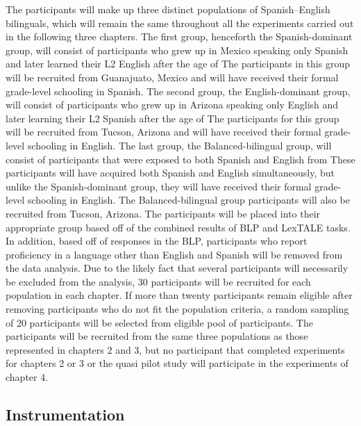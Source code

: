 \documentclass[
12pt, %
english, %
doublespacing, %
nolistspacing, %
liststotoc, %
headsepline, %
chapterinoneline, %
openany, %
]{DoctoralThesis}\usepackage[]{graphicx}\usepackage[]{color}
\begin{document}
The participants will make up three distinct populations of Spanish–English bilinguals, which will remain the same throughout all the experiments carried out in the following three chapters. The first group, henceforth the Spanish-dominant group, will consist of participants who grew up in Mexico speaking only Spanish and later learned their L2 English after the age of %
The participants in this group will be recruited from Guanajuato, Mexico and will have received their formal grade-level schooling in Spanish. The second group, the English-dominant group, will consist of participants who grew up in Arizona speaking only English and later learning their L2 Spanish after the age of %
The participants for this group will be recruited from Tucson, Arizona and will have received their formal grade-level schooling in English. The last group, the Balanced-bilingual group, will consist of participants that were exposed to both Spanish and English from %
These participants will have acquired both Spanish and English simultaneously, but unlike the Spanish-dominant group, they will have received their formal grade-level schooling in English. The Balanced-bilingual %
group participants will also be recruited from Tucson, Arizona. The participants will be placed into their appropriate group based off of the combined results of BLP and LexTALE tasks. In addition, based off of responses in the BLP, participants who report proficiency in a language other than English and Spanish will be removed from the data analysis. Due to the likely fact that several participants will necessarily be excluded from the analysis, 30 participants will be recruited for each population in each chapter. If more than twenty participants remain eligible after removing participants who do not fit the population criteria, a random sampling of 20 participants will be selected from eligible pool of participants. The participants will be recruited from the same three populations as those represented in chapters 2 and 3, but no participant that completed experiments for chapters 2 or 3 or the quasi pilot study will participate in the experiments of chapter 4. 

\subsection{Instrumentation}
\end{document}
